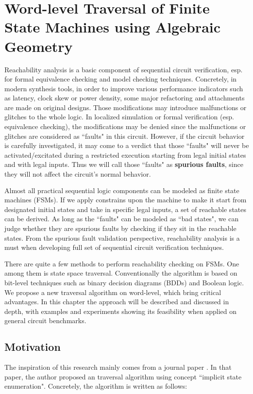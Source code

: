\chapter{Word-level Traversal of Finite State Machines using Algebraic Geometry}
\label{ch:reacha}
Reachability analysis is a basic component of sequential circuit verification, esp. for 
formal equivalence checking and model checking techniques. Concretely, in modern synthesis 
tools, in order to improve various performance indicators such as latency, clock skew or power
density, some major refactoring and attachments are made on original designs. 
Those modifications may introduce malfunctions or glitches to the whole logic. 
In localized simulation or formal verification (esp. equivalence checking), the modifications may be 
denied since the malfunctions or glitches are considered as ``faults" in this circuit.
However, if the circuit behavior is carefully investigated, it may come to a verdict that 
those ``faults" will never be activated/excitated during a restricted execution starting 
from legal initial states and with legal inputs. Thus we will call those ``faults" as 
{\bf spurious faults}, since they will not affect the circuit's normal behavior.

Almost all practical sequential logic components can be modeled as finite state machines (FSMs). 
If we apply constrains upon the machine to make it start from designated initial states and 
take in specific legal inputs, a set of reachable states can be derived. 
As long as the ``faults" can be modeled as ``bad states", we can judge whether they are 
spurious faults by checking if they sit in the reachable states. From the spurious fault validation 
perspective, reachability analysis is a must when developing full set of sequential circuit verification
techniques.

There are quite a few methods to perform reachability checking on FSMs. One among them is 
state space traversal. Conventionally the algorithm is based on bit-level techniques such as
binary decision diagrams (BDDs) and Boolean logic. We propose a new traversal algorithm on word-level,
which bring critical advantages. In this chapter the approach will be described and discussed in depth, 
with examples and experiments showing its feasibility when applied on general circuit benchmarks.

\section{Motivation}
The inspiration of this research mainly comes from a journal paper \cite{KallaPartialScan}. 
In that paper, the author proposed an traversal algorithm using concept ``implicit state enumeration".
Concretely, the algorithm is written as follows:

